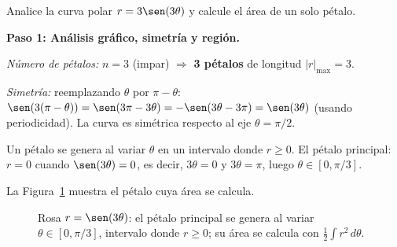 \begin{example}[Área de un pétalo de la rosa $r = 3\sen(3\theta)$]
Analice la curva polar $r = 3\sen(3\theta)$ y calcule el área de un solo
pétalo.

\begin{myproof}

\textbf{Paso 1: Análisis gráfico, simetría y región.}

\emph{Número de pétalos:} $n = 3$ (impar) $\Rightarrow$ \textbf{3 pétalos}
de longitud $|r|_{\max} = 3$.

\emph{Simetría:} reemplazando $\theta$ por $\pi - \theta$:
$\sen(3(\pi-\theta)) = \sen(3\pi - 3\theta) = -\sen(3\theta - 3\pi) = \sen(3\theta)$
(usando periodicidad). La curva es simétrica respecto al eje $\theta = \pi/2$.

Un pétalo se genera al variar $\theta$ en un intervalo donde $r \geq 0$.
El pétalo principal: $r = 0$ cuando $\sen(3\theta) = 0$, es decir,
$3\theta = 0$ y $3\theta = \pi$, luego $\theta \in [0, \pi/3]$.

La Figura~\ref{fig:rosa_area_petalo} muestra el pétalo cuya área se calcula.

\begin{figure}[H]
\centering
{}
\caption{Rosa $r=\sen(3\theta)$: el pétalo principal se genera al variar $\theta\in[0,\pi/3]$, intervalo donde $r\geq 0$; su área se calcula con $\tfrac12\int r^2\,d\theta$.}
\label{fig:rosa_area_petalo}
\end{figure}


\end{myproof}
\end{example}
